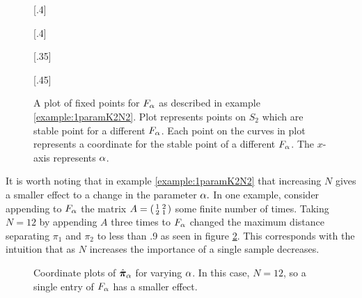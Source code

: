 \begin{figure}[ht]
	\centering
	[.4\linewidth]{
		
	}
	[.4\linewidth]{
		
	}
	[.35\linewidth]{
		
	}
	[.45\linewidth]{
		
	}
	\caption[A plot of fixed points for \( F_\ga \)]{A plot of fixed points for \( F_\ga \) as described in example \ref{example:1paramK2N2}. Plot  represents points on \( S_2 \) which are stable point for a different \( F_\ga \).   Each point on the curves in plot  represents a coordinate for the stable point of a different \( F_\ga \). The \( x \)-axis represents \( \alpha \). }
	\label{fig:1paramExample}
\end{figure}



It is worth noting that in example \ref{example:1paramK2N2} that increasing \( N \) gives a smaller effect to a change in the parameter \( \alpha. \)  In one example, consider appending to \( F_\ga \) the matrix 
\(A = \begin{psmallmatrix}
	1&2\\
	2&1
\end{psmallmatrix} \) some finite number of times.
Taking \( N=12 \) by appending \( A \) three times to \( F_\ga \) changed the maximum distance separating \( \pi_1 \) and \( \pi_2 \) to less than .9 as seen in figure \ref{fig:1ParamN12}.  This corresponds with the intuition that as \( N \) increases the importance of a single sample decreases.

\begin{figure}[ht]
	\centering
	
	\caption[Example with \( K=2 \) and \( N=12 \)]{Coordinate plots of \( \hat{\bm\pi}_\alpha \) for varying \( \alpha \). In this case, \(N=12\), so a single entry of \( F_\ga \) has a smaller effect.}
	\label{fig:1ParamN12}
\end{figure}

